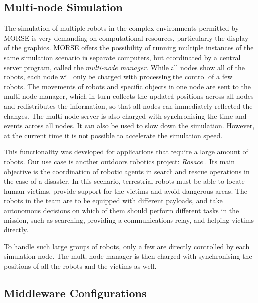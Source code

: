 \documentclass{llncs}
\begin{document}
\subsection{Multi-node Simulation}
\label{section:multinode}

The simulation of multiple robots in the complex environments permitted by
MORSE is very demanding on computational resources, particularly the
display of the graphics. MORSE offers the possibility of running multiple
instances of the same simulation scenario in separate computers, but
coordinated by a central server program, called the \emph{multi-node
manager}. While all nodes show all of the robots, each node will only
be charged with processing the control of a few robots. The movements
of robots and specific objects in one node are sent to the multi-node
manager, which in turn collects the updated positions across all nodes
and redistributes the information, so that all nodes can immediately
reflected the changes.  The multi-node server is also charged with
synchronising the time and events across all nodes. It can also be used
to slow down the simulation. However, at the current time it is not
possible to accelerate the simulation speed.

This functionality was developed for applications that require a large amount
of robots. Our use case is another outdoors robotics project: \emph{Rosace}
\cite{springerlink:10.1007/978-3-642-12384-9_18,springerlink:10.1007/978-3-642-28786-2_32}.
Its main objective is the coordination of robotic agents in search and rescue
operations in the case of a disaster. In this scenario, terrestrial robots must
be able to locate human victims, provide support for the victims and avoid
dangerous areas. The robots in the team are to be equipped with different
payloads, and take autonomous decisions on which of them should perform
different tasks in the mission, such as searching, providing a communications
relay, and helping victims directly.

To handle such large groups of robots, only a few are directly controlled by
each simulation node. The multi-node manager is then charged with synchronising
the positions of all the robots and the victims as well.





\subsection {Middleware Configurations}
\label{section:middlewares}
\end{document}

